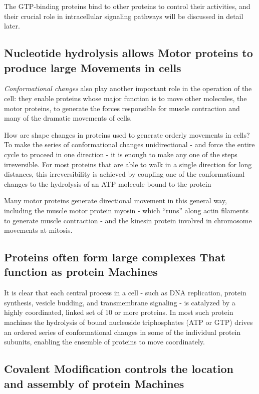 The GTP-binding proteins bind to other proteins to
control their activities, and their crucial role in intracellular signaling
pathways will be discussed in detail later.

\subsection{Nucleotide hydrolysis allows Motor proteins to produce large Movements in cells}

\textit{Conformational changes} also play another important role in the operation of the cell: they enable
proteins whose major function is to move other molecules, the motor
proteins, to generate the forces responsible for muscle contraction and
many of the dramatic movements of cells.

How are shape changes in proteins used to generate orderly movements
in cells?
To make the series of conformational changes unidirectional - and force
the entire cycle to proceed in one direction - it is enough to make any
one of the steps irreversible. For most proteins that are able to walk in
a single direction for long distances, this irreversibility is achieved by
coupling one of the conformational changes to the hydrolysis of an ATP
molecule bound to the protein

Many motor proteins generate directional movement in this general way,
including the muscle motor protein myosin - which “runs” along actin
filaments to generate muscle contraction - and
the kinesin protein involved in chromosome movements at mitosis.

\subsection{Proteins often form large complexes That function as protein Machines}

It is clear that each central process in
a cell - such as DNA replication, protein synthesis, vesicle budding, and
transmembrane signaling - is catalyzed by a highly coordinated, linked
set of 10 or more proteins. In most such protein machines the hydrolysis
of bound nucleoside triphosphates (ATP or GTP) drives an ordered series
of conformational changes in some of the individual protein subunits,
enabling the ensemble of proteins to move coordinately.

\subsection{Covalent Modification controls the location and assembly of protein Machines}

